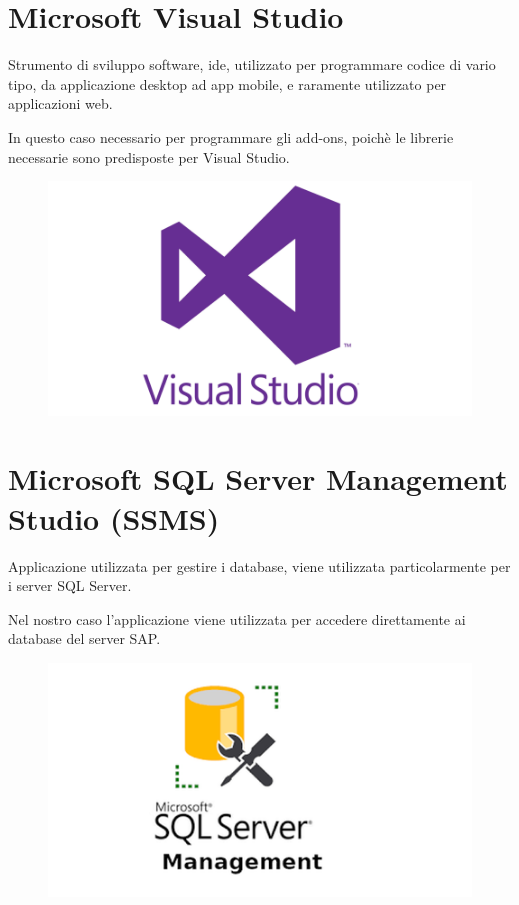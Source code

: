 \section{Microsoft Visual Studio}
\begin{flushleft}
	Strumento di sviluppo software, \gls{ide}, utilizzato per programmare codice di vario tipo, da applicazione desktop ad app mobile, e raramente utilizzato per applicazioni web.
	
	In questo caso necessario per programmare gli add-ons, poichè le librerie necessarie sono predisposte per Visual Studio.
\end{flushleft}
\begin{figure}[!h] 
	\centering
	\includegraphics[scale = 0.4]{immagini/tecnologie/visual-studio}
\end{figure}
\section{Microsoft SQL Server Management Studio (SSMS)}
\begin{flushleft}
	Applicazione utilizzata per gestire i database, viene utilizzata particolarmente per i server SQL Server.
	
	Nel nostro caso l'applicazione viene utilizzata per accedere direttamente ai database del server SAP.
	
\end{flushleft}
\begin{figure}[!h] 
	\centering
	\includegraphics[scale = 0.5]{immagini/tecnologie/microsoft ssms}
\end{figure}

